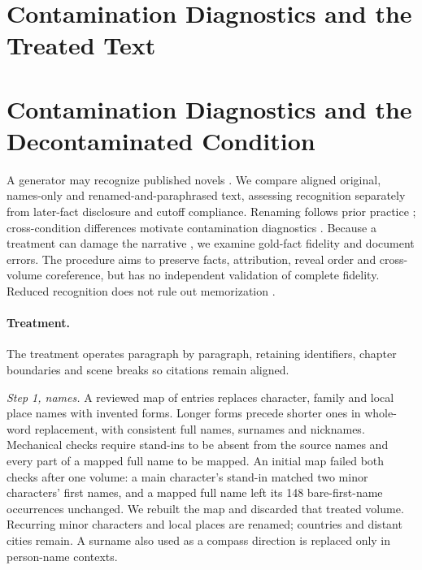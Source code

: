 \ifdefined\nwvtwo
\section{Contamination Diagnostics and the Treated Text}
\else
\section{Contamination Diagnostics and the Decontaminated Condition}
\fi
\label{app:contamination}

A generator may recognize published novels \citep{chang2023speak}. We compare aligned
original, names-only and renamed-and-paraphrased text, assessing recognition separately
from later-fact disclosure and cutoff compliance. Renaming follows prior practice
\citep{gupta2025whodunit, zhang2024infinitebench}; cross-condition differences motivate
contamination diagnostics \citep{dekoninck2024constat}. Because a treatment can damage
the narrative \citep{sun2025emperor}, we examine gold-fact fidelity and document errors.
The procedure aims to preserve facts, attribution, reveal order and cross-volume
coreference, but has no independent validation of complete fidelity. Reduced recognition
does not rule out memorization \citep{cheng2025contamination}.


\paragraph{Treatment.}
The treatment operates paragraph by paragraph, retaining identifiers, chapter boundaries
and scene breaks so citations remain aligned.

\emph{Step 1, names.} A reviewed map of  entries replaces character,
family and local place names with invented forms. Longer forms precede shorter ones
in whole-word replacement, with consistent full names, surnames and nicknames.
Mechanical checks require stand-ins to be absent from the source names and every part
of a mapped full name to be mapped. An initial map failed both checks after one volume:
a main character's stand-in matched two minor characters' first names, and a mapped
full name left its 148 bare-first-name occurrences unchanged. We rebuilt the map and
discarded that treated volume. Recurring minor characters and local places are renamed;
countries and distant cities remain. A surname also used as a compass direction is
replaced only in person-name contexts.

